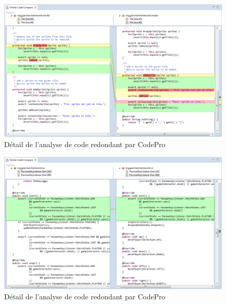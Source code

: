 \documentclass[12pt,a4paper,final]{article}
\begin{document}
\begin{figure}[ht]
	\centering
	\includegraphics[width=\textwidth]{images/SimilarCode_3.png}
	\caption{\label{SimilarCode3}Détail de l'analyse de code redondant par CodePro}
\end{figure}

\begin{figure}[ht]
	\centering
	\includegraphics[width=\textwidth]{images/SimilarCode_4.png}
	\caption{\label{SimilarCode4}Détail de l'analyse de code redondant par CodePro}
\end{figure}
\end{document}
